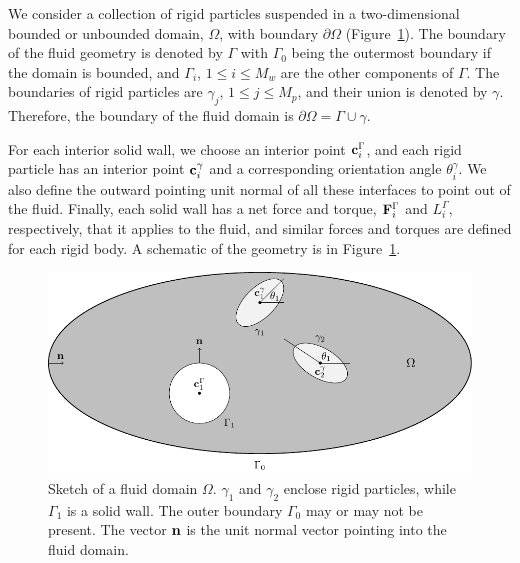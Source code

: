 \documentclass[preprint, 10pt]{elsarticle}
\begin{document}
We consider a collection of rigid particles suspended in a
two-dimensional bounded or unbounded domain, $\Omega$, with boundary
$\partial\Omega$ (Figure~\ref{fig:geomSchematic}).  The boundary of the
fluid geometry is denoted by $\Gamma$ with $\Gamma_0$ being the
outermost boundary if the domain is bounded, and $\Gamma_i$, $1\leq i
\leq M_w$ are the other components of $\Gamma$.  The boundaries of rigid
particles are $\gamma_j$, $1\leq j\leq M_p$, and their union is denoted by
$\gamma$. Therefore, the boundary of the fluid domain is $ \partial\Omega
=\Gamma \cup \gamma$.
 
For each interior solid wall, we choose an interior point
${\mathbf{c}}^\Gamma_i$, and each rigid particle has an interior point
${\mathbf{c}}^\gamma_i$ and a corresponding orientation angle $\theta^\gamma_i$.
We also define the outward pointing unit normal of all these interfaces
to point out of the fluid. Finally, each solid wall has a net force and
torque, ${\mathbf{F}}^\Gamma_i$ and $L^\Gamma_i$, respectively, that it applies
to the fluid, and similar forces and torques are defined for each rigid
body.  A schematic of the geometry is in Figure~\ref{fig:geomSchematic}.

\begin{figure}[!h]
\begin{center}
\includegraphics{figures/multiply_connected.pdf}
\end{center}
\caption{\label{fig:geomSchematic}Sketch of a fluid domain $\Omega$.
$\gamma_1$ and $\gamma_2$ enclose rigid particles, while $\Gamma_1$ is a solid
wall. The outer boundary $\Gamma_0$ may or may not be present.  The vector
${\mathbf{n}}$ is the unit normal vector pointing into the fluid domain.}
\end{figure}

\end{document}

